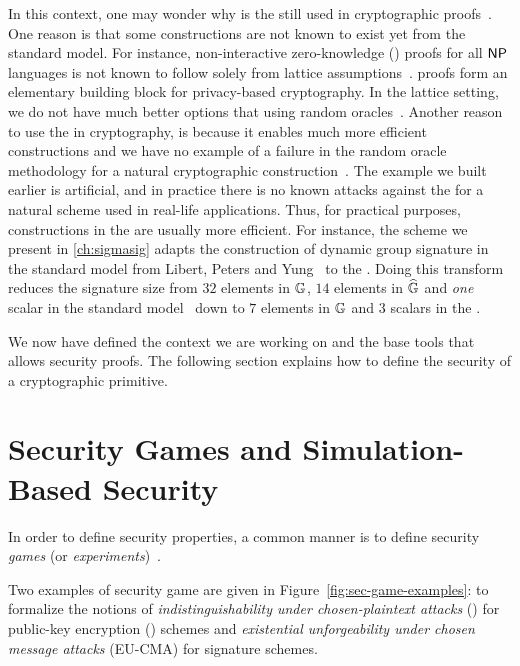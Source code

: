 In this context, one may wonder why is the \ROM still used in cryptographic proofs~\cite{LMPY16,LLM+16}.
One reason is that some constructions are not known to exist yet from the standard model.
For instance, non-interactive zero-knowledge (\NIZK) proofs for all $\textsf{NP}$ languages is not known to follow solely from lattice assumptions~\cite{Ste96,Lyu08}.
\NIZK proofs form an elementary building block for privacy-based cryptography. In the lattice setting, we do not have much better options that using random oracles~\cite{LLM+16}.
Another reason to use the \ROM in cryptography, is because it enables much more efficient constructions and we have no example of a failure in the random oracle methodology for a natural cryptographic construction~\cite{BR93}.
The example we built earlier is artificial, and in practice there is no known attacks against the \ROM for a natural scheme used in real-life applications.
Thus, for practical purposes, constructions in the \ROM are usually more efficient.
For instance, the scheme we present in \cref{ch:sigmasig} adapts the construction of dynamic group signature in the standard model from Libert, Peters and Yung~\cite{LPY15} to the \ROM.
Doing this transform reduces the signature size from $32$ elements in $\mathbb{G}$, $14$ elements in $\widehat{\mathbb{G}}$ and \textit{one} scalar in the standard model~\cite[App. J]{LPY15} down to $7$ elements in $\mathbb{G}$ and $3$ scalars in the \ROM.

We now have defined the context we are working on and the base tools that allows security proofs.
The following section explains how to define the security of a cryptographic primitive.

\section{Security Games and Simulation-Based Security} \label{se:games-sim}


In order to define security properties, a common manner is to define security \emph{games} (or \emph{experiments})~\cite{GM82,Sho06}.

Two examples of security game are given in Figure~\ref{fig:sec-game-examples}: to formalize the notions of \emph{indistinguishability under chosen-plaintext attacks} (\indcpa) for public-key encryption (\PKE) schemes and \emph{existential unforgeability under chosen message attacks} (EU-CMA) for signature schemes.

